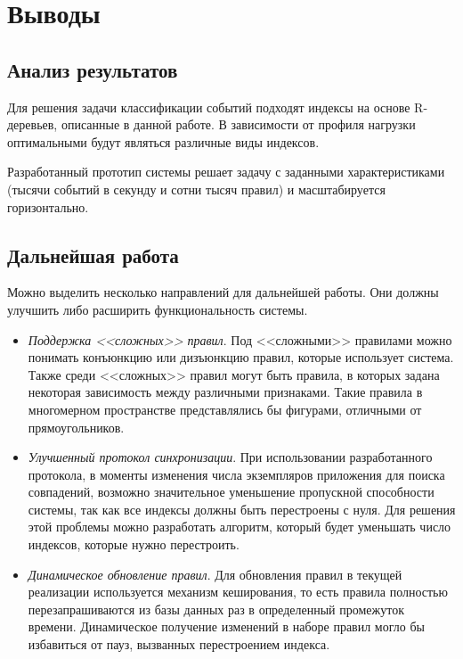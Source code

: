 \documentclass[14pt]{article}
\begin{document}
\section{Выводы}
\subsection{Анализ результатов}
Для решения задачи классификации событий подходят индексы на основе R-деревьев, описанные в данной работе. В зависимости от профиля нагрузки оптимальными будут являться различные виды индексов.

Разработанный прототип системы решает задачу с заданными характеристиками (тысячи событий в секунду и сотни тысяч правил) и масштабируется горизонтально.

\subsection{Дальнейшая работа}
Можно выделить несколько направлений для дальнейшей работы. Они должны улучшить либо расширить функциональность системы.
\begin{itemize}
    \item \emph{Поддержка <<сложных>> правил}. Под <<сложными>> правилами можно понимать конъюнкцию или дизъюнкцию правил, которые использует система. Также среди <<сложных>> правил могут быть правила, в которых задана некоторая зависимость между различными признаками. Такие правила в многомерном пространстве представлялись бы фигурами, отличными от прямоугольников.
    \item \emph{Улучшенный протокол синхронизации}. При использовании разработанного протокола, в моменты изменения числа экземпляров приложения для поиска совпадений, возможно значительное уменьшение пропускной способности системы, так как все индексы должны быть перестроены с нуля. Для решения этой проблемы можно разработать алгоритм, который будет уменьшать число индексов, которые нужно перестроить.
    \item \emph{Динамическое обновление правил}. Для обновления правил в текущей реализации используется механизм кеширования, то есть правила полностью перезапрашиваются из базы данных раз в определенный промежуток времени. Динамическое получение изменений в наборе правил могло бы избавиться от пауз, вызванных перестроением индекса.
\end{itemize}
\newpage
\end{document}
